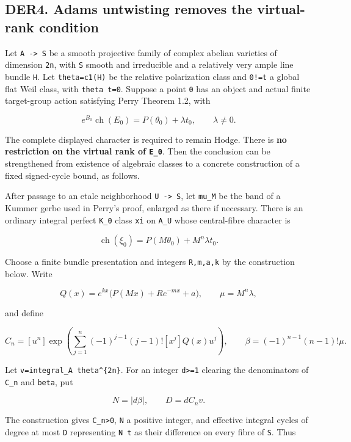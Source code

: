 \documentclass[11pt,a4paper]{article}
\theoremstyle{definition}
\begin{document}
\subsection{DER4. Adams untwisting removes the virtual-rank
condition}\label{der4.-adams-untwisting-removes-the-virtual-rank-condition}

Let \texttt{A\ -\textgreater{}\ S} be a smooth projective family of
complex abelian varieties of dimension \texttt{2n}, with \texttt{S}
smooth and irreducible and a relatively very ample line bundle
\texttt{H}. Let \texttt{theta=c1(H)} be the relative polarization class
and \texttt{0!=t} a global flat Weil class, with \texttt{theta\ t=0}.
Suppose a point \texttt{0} has an object and actual finite target-group
action satisfying Perry Theorem 1.2, with

\[
 e^{B_0}\operatorname{ch}(E_0)=P(\theta_0)+\lambda t_0,
 \qquad \lambda\ne0.
\tag{DER4a}
\]

The complete displayed character is required to remain Hodge. There is
\textbf{no restriction on the virtual rank of \texttt{E\_0}}. Then the
conclusion can be strengthened from existence of algebraic classes to a
concrete construction of a fixed signed-cycle bound, as follows.

After passage to an etale neighborhood \texttt{U\ -\textgreater{}\ S},
let \texttt{mu\_M} be the band of a Kummer gerbe used in Perry's proof,
enlarged as there if necessary. There is an ordinary integral perfect
\texttt{K\_0} class \texttt{xi} on \texttt{A\_U} whose central-fibre
character is

\[
 \operatorname{ch}(\xi_0)=P(M\theta_0)+M^n\lambda t_0.
\tag{DER4b}
\]

Choose a finite bundle presentation and integers \texttt{R,m,a,k} by the
construction below. Write

\[
 Q(x)=e^{kx}\bigl(P(Mx)+R e^{-mx}+a\bigr),
 \qquad \mu=M^n\lambda,
\]

and define

\[
 C_n=[u^n]\exp\!\left(
 \sum_{j=1}^{n}(-1)^{j-1}(j-1)![x^j]Q(x)u^j\right),
 \qquad \beta=(-1)^{n-1}(n-1)!\mu.
\tag{DER4c}
\]

Let \texttt{v=integral\_A\ theta\^{}\{2n\}}. For an integer
\texttt{d\textgreater{}=1} clearing the denominators of \texttt{C\_n}
and \texttt{beta}, put

\[
 N=|d\beta|,\qquad D=dC_n v.
\tag{DER4d}
\]

The construction gives \texttt{C\_n\textgreater{}0}, \texttt{N} a
positive integer, and effective integral cycles of degree at most
\texttt{D} representing \texttt{N\ t} as their difference on every fibre
of \texttt{S}. Thus
\end{document}
